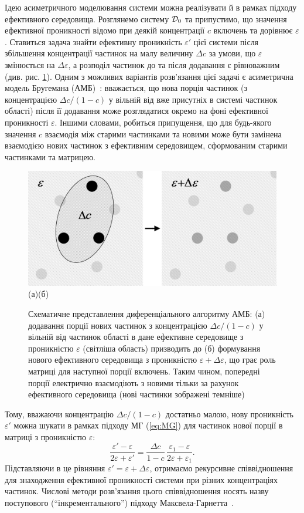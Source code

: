 \documentclass[14pt,twoside]{vakthesis}
\newcommand{\colr}{\color{black}}
\begin{document}
Ідею асиметричного моделювання системи можна реалізувати й в рамках підходу ефективного середовища.
Розглянемо систему ${\cal D}_0$ та припустимо, що значення ефективної проникності відомо при деякій концентрації $c$ включень та дорівнює $\varepsilon$. Ставиться задача знайти ефективну проникність $\varepsilon'$ цієї системи після збільшення концентрації частинок на малу величину $\Delta c$ за умови, що $\varepsilon$ змінюється на $\Delta\varepsilon$, а розподіл частинок до та після додавання є рівноважним (див. рис. \ref{fig:HanaiDiff}).
Одним з можливих варіантів розв'язання цієї задачі є асиметрична модель Бругемана (АМБ)~\cite{Bruggeman1935}: вважається, що нова порція частинок (з концентрацією $\Delta c/(1-c)$ у вільній від вже присутніх в системі частинок області) після її додавання може розглядатися окремо на фоні ефективної проникності $\varepsilon$. 
Іншими словами, робиться припущення, що для будь-якого значення $c$ взаємодія між старими частинками та новими може бути замінена взаємодією нових частинок з ефективним середовищем, сформованим старими частинками та матрицею. 
\begin{figure}[tb]
	\centering
	\includegraphics[height=0.3\textwidth]{HanaiDiff.eps}\\
	(а)\qquad\qquad\qquad\qquad\qquad\qquad(б)
	\caption{\label{fig:HanaiDiff}Схематичне представлення
		диференціального алгоритму АМБ: (а) додавання порції
		нових частинок з концентрацією $\Delta c/(1-c)$ у вільній
		від частинок області в дане ефективне середовище з
		проникністю $\varepsilon$ (світліша область) призводить до
		(б) формування нового ефективного середовища з проникністю
		$\varepsilon + \Delta\varepsilon$, що грає роль матриці для
		наступної порції включень. Таким чином, попередні порції
		електрично взаємодіють з новими тільки за рахунок
		ефективного середовища (нові частинки зображені
		темніш{\colr е})}
\end{figure}
Тому, вважаючи концентрацію $\Delta c/(1-c)$ достатньо малою, нову проникність $\varepsilon'$ можна шукати  в рамках підходу МГ (\ref{eq:MG}) для частинок нової порції в матриці з проникністю $\varepsilon$:
\begin{equation}\label{eq:Hanai-diff-start}
\frac{\varepsilon' - \varepsilon}{2 \varepsilon + \varepsilon'} = \frac{\Delta c}{1 - c}\, \frac{\varepsilon_1 - \varepsilon}{2\varepsilon + \varepsilon_1}. 
\end{equation}
Підставляючи в це рівняння $\varepsilon' = \varepsilon + \Delta\varepsilon$, отримаємо рекурсивне співвідношення для знаходження ефективної проникності системи при різних концентраціях частинок.
Числові методи розв'язання цього співвідношення носять назву поступового (``інкрементального'') підходу Максвела-Гарнетта~\cite{Lakhtakia1998, Michel2001}.
\end{document}
